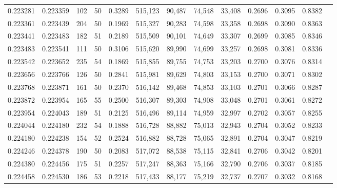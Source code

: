 \begin{tabular}{rrrrrrrrrrrrr}
0.223281 & 0.223359 &   102 &  50 &                                     0.3289 & 515,123 &  90,487 &  74,548 &  33,408 & 0.2696 & 0.3095 & 0.8382 \\
0.223361 & 0.223439 &   204 &  50 &                                     0.1969 & 515,327 &  90,283 &  74,598 &  33,358 & 0.2698 & 0.3090 & 0.8363 \\
0.223441 & 0.223483 &   182 &  51 &                                     0.2189 & 515,509 &  90,101 &  74,649 &  33,307 & 0.2699 & 0.3085 & 0.8346 \\
0.223483 & 0.223541 &   111 &  50 &                                     0.3106 & 515,620 &  89,990 &  74,699 &  33,257 & 0.2698 & 0.3081 & 0.8336 \\
0.223542 & 0.223652 &   235 &  54 &                                     0.1869 & 515,855 &  89,755 &  74,753 &  33,203 & 0.2700 & 0.3076 & 0.8314 \\
0.223656 & 0.223766 &   126 &  50 &                                     0.2841 & 515,981 &  89,629 &  74,803 &  33,153 & 0.2700 & 0.3071 & 0.8302 \\
0.223768 & 0.223871 &   161 &  50 &                                     0.2370 & 516,142 &  89,468 &  74,853 &  33,103 & 0.2701 & 0.3066 & 0.8287 \\
0.223872 & 0.223954 &   165 &  55 &                                     0.2500 & 516,307 &  89,303 &  74,908 &  33,048 & 0.2701 & 0.3061 & 0.8272 \\
0.223954 & 0.224043 &   189 &  51 &                                     0.2125 & 516,496 &  89,114 &  74,959 &  32,997 & 0.2702 & 0.3057 & 0.8255 \\
0.224044 & 0.224180 &   232 &  54 &                                     0.1888 & 516,728 &  88,882 &  75,013 &  32,943 & 0.2704 & 0.3052 & 0.8233 \\
0.224180 & 0.224238 &   154 &  52 &                                     0.2524 & 516,882 &  88,728 &  75,065 &  32,891 & 0.2704 & 0.3047 & 0.8219 \\
0.224246 & 0.224378 &   190 &  50 &                                     0.2083 & 517,072 &  88,538 &  75,115 &  32,841 & 0.2706 & 0.3042 & 0.8201 \\
0.224380 & 0.224456 &   175 &  51 &                                     0.2257 & 517,247 &  88,363 &  75,166 &  32,790 & 0.2706 & 0.3037 & 0.8185 \\
0.224458 & 0.224530 &   186 &  53 &                                     0.2218 & 517,433 &  88,177 &  75,219 &  32,737 & 0.2707 & 0.3032 & 0.8168 \\

\end{tabular}
